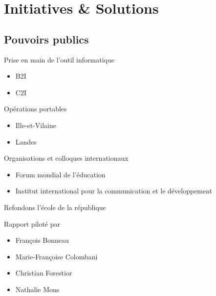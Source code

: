 \section{Initiatives \& Solutions}

\subsection{Pouvoirs publics}

\begin{frame}{Prise en main de l'outil informatique}
	  \begin{itemize}
	  \item B2I
	  \item C2I
	  \end{itemize}
\end{frame}

\begin{frame}{Opérations portables}
	  \begin{itemize}
	  \item Ille-et-Vilaine
	  \item Landes
	  \end{itemize}
\end{frame}

\begin{frame}{Organisations et colloques internationaux}
	  \begin{itemize}
	  \item Forum mondial de l'éducation
	  \item Institut international pour la communication et le développement
	  \end{itemize}
\end{frame}

\begin{frame}{Refondons l'école de la république}

\begin{block}{Rapport piloté par}
  \begin{itemize}
  \item François Bonneau
  \item Marie-Françoise Colombani
  \item Christian Forestior
  \item Nathalie Mons
  \end{itemize}
\end{block}


\end{frame}


